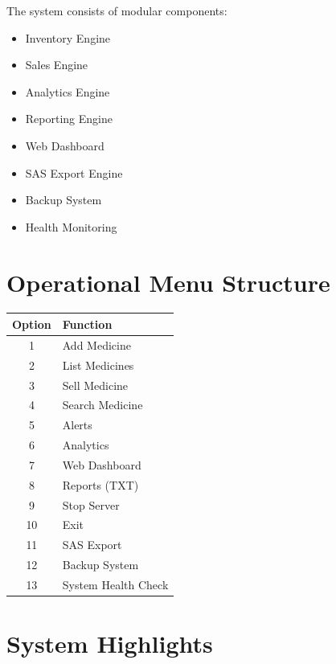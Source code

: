 \documentclass[12pt,a4paper]{article}
\begin{document}
The system consists of modular components:

\begin{itemize}
\item Inventory Engine
\item Sales Engine
\item Analytics Engine
\item Reporting Engine
\item Web Dashboard
\item SAS Export Engine
\item Backup System
\item Health Monitoring
\end{itemize}

\section{Operational Menu Structure}

\begin{longtable}{cl}
\toprule
\textbf{Option} & \textbf{Function} \\
\midrule

1  & Add Medicine \\
2  & List Medicines \\
3  & Sell Medicine \\
4  & Search Medicine \\
5  & Alerts \\
6  & Analytics \\
7  & Web Dashboard \\
8  & Reports (TXT) \\
9  & Stop Server \\
10 & Exit \\
11 & SAS Export \\
12 & Backup System \\
13 & System Health Check \\

\bottomrule
\end{longtable}

\section{System Highlights}
\end{document}
